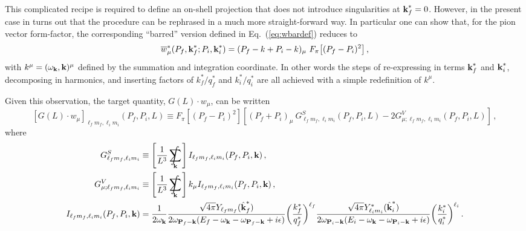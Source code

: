This complicated recipe is required to define an on-shell projection that does not introduce singularities at $\textbf k^*_f = 0$. However, in the present case in turns out that the procedure can be rephrased in a much more straight-forward way. In particular one can show that, for the pion vector form-factor, the corresponding ``barred'' version defined in Eq.~(\ref{eq:wbardef}) reduces to
\begin{equation}
\overline w^*_\mu(P_f ,\textbf k_{f}^* ; P_i , \textbf k_{i}^*) = (P_f - k + P_i - k)_\mu \  F_\pi \big [(P_f - P_i)^2 \big ] \,,
\end{equation}
 with $k^\mu = (\omega_{\textbf k}, \textbf k)^\mu$ defined by the summation and integration coordinate. {} In other words the steps of re-expressing in terms $\textbf k_{f}^*$ and $\textbf k_{i}^*$, decomposing in harmonics, and inserting factors of $k^*_f/q^*_f$ and $k^*_i/q^*_i$ are all achieved with a simple redefinition of $k^\mu$.

Given this observation, the target quantity, $G(L) \cdot w_\mu$, can be written
\begin{equation}
\label{eq:Gdotw}
[G(L) \cdot w_\mu]_{  \ell_f m_{f},  \ell_i m_{i}}(P_f,P_i,L)  \equiv F_\pi[(P_f - P_i)^2] \left [ (P_f + P_i)_\mu  \ G^S_{ \ell_f m_{f},  \ell_i m_{i}}(P_f,P_i,L)   - 2 G^V_{\mu;  \ell_f m_{f},  \ell_i m_{i}}(P_f,P_i,L)    \right ] \,,
\end{equation}
where
\begin{align}
G_{\ell_f m_{f},  \ell_i m_{i}}^S & \equiv 
 \left[\frac{1}{L^3}\sum_{\mathbf{k}}\hspace{-.5cm}\int~\right]  I_{\ell_f m_{f},  \ell_i m_{i}}(P_f, P_i, \textbf k)
  \,,  \\
  G_{\mu; {\ell_f m_{f},  \ell_i m_{i}} }^V & \equiv 
 \left[\frac{1}{L^3}\sum_{\mathbf{k}}\hspace{-.5cm}\int~\right] k_\mu  I_{\ell_f m_{f},  \ell_i m_{i}}(P_f, P_i, \textbf k)
  \,,  \\
  I_{\ell_f m_{f},  \ell_i m_{i}}(P_f, P_i, \textbf k) & = \frac{1}{2\omega_{\textbf k}}
\frac{ \sqrt{4 \pi}  Y_{\ell_fm_{ f}}(\hat {\textbf k}^*_{f})
 }{2 \omega_{{\textbf P_f - \textbf k}}(E_f -  \omega_{\textbf k} - \omega_{\textbf P_f - \textbf k} + i \epsilon )} 
  \bigg (\frac{k^{*}_{f}}{q^*_{f}} \bigg)^{\ell_f }
\frac{ \sqrt{4 \pi}  
Y^*_{\ell_i m_{i}}(\hat {\textbf k}^*_{i})
 }{2 \omega_{\textbf P_i - \textbf k}(E_i -  \omega_{\textbf k} - \omega_{\textbf P_i - \textbf k} + i \epsilon )} 
 \bigg (\frac{k^{*}_{i}}{q^*_{i}} \bigg)^{\ell_i } \,.
\end{align}
{}

